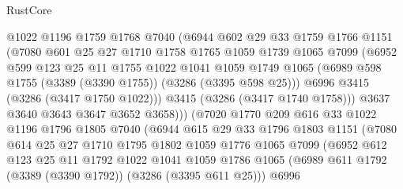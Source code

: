 \begin{lexlean}{RustCore}
\begin{coremodule}
                    @1022
                    @1196
                    @1759
                    @1768
                    @7040
                    (@6944
                      @602
                      @29
                      @33
                      @1759
                      @1766
                      @1151
                      (@7080
                        @601
                        @25
                        @27
                        @1710
                        @1758
                        @1765
                        @1059
                        @1739
                        @1065
                        @7099
                        (@6952
                          @599
                          @123
                          @25
                          @11
                          @1755
                          @1022
                          @1041
                          @1059
                          @1749
                          @1065
                          (@6989 @598 @1755 (@3389 (@3390 @1755)) (@3286 (@3395 @598 @25)))
                          @6996
                          @3415
                          (@3286 (@3417 @1750 @1022)))
                        @3415
                        (@3286 (@3417 @1740 @1758)))
                      @3637
                      @3640
                      @3643
                      @3647
                      @3652
                      @3658)))
                (@7020
                  @1770
                  @209
                  @616
                  @33
                  @1022
                  @1196
                  @1796
                  @1805
                  @7040
                  (@6944
                    @615
                    @29
                    @33
                    @1796
                    @1803
                    @1151
                    (@7080
                      @614
                      @25
                      @27
                      @1710
                      @1795
                      @1802
                      @1059
                      @1776
                      @1065
                      @7099
                      (@6952
                        @612
                        @123
                        @25
                        @11
                        @1792
                        @1022
                        @1041
                        @1059
                        @1786
                        @1065
                        (@6989 @611 @1792 (@3389 (@3390 @1792)) (@3286 (@3395 @611 @25)))
                        @6996

\end{coremodule}
\end{lexlean}
